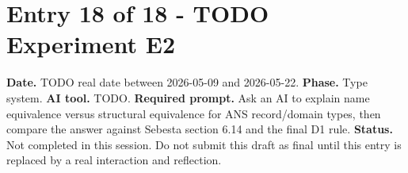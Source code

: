 \documentclass[11pt,a4paper]{article}
\begin{document}
\section*{Entry 18 of 18 - TODO Experiment E2}
\textbf{Date.} TODO real date between 2026-05-09 and 2026-05-22.
\textbf{Phase.} Type system.
\textbf{AI tool.} TODO.
\textbf{Required prompt.} Ask an AI to explain name equivalence versus structural equivalence for ANS record/domain types, then compare the answer against Sebesta section 6.14 and the final D1 rule.
\textbf{Status.} Not completed in this session. Do not submit this draft as final until this entry is replaced by a real interaction and reflection.
\end{document}
